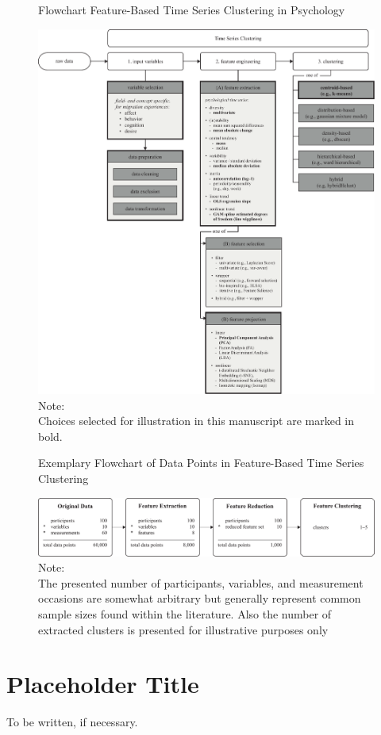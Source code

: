 \documentclass[man, 12pt, a4paper]{apa7}
\theoremstyle{break}
\theoremstyle{plain}
\begin{document}
\begin{figure}[hbtp]
  \caption{Flowchart Feature-Based Time Series Clustering in Psychology}
  \label{fig:TSCFlow}
  \centering\includegraphics[width=\textwidth]{figures/TS Cluster Flow/TimeSeriesClusterFlowSelection.pdf}
  \caption*{Note: \\
  Choices selected for illustration in this manuscript are marked in bold.}
\end{figure}

\begin{figure}[hbtp]
  \caption{Exemplary Flowchart of Data Points in Feature-Based Time Series Clustering}
  \label{fig:TSCFlowN}
  \centering\includegraphics[width=\textwidth]{figures/TS Cluster Flow/tsClustFlowN.pdf}
  \caption*{Note: \\
  The presented number of participants, variables, and measurement occasions are somewhat arbitrary but generally represent common sample sizes found within the literature. Also the number of extracted clusters is presented for illustrative purposes only}
\end{figure}

\printbibliography

\appendix

\section{Placeholder Title}
\label{app:AppendixTitle}
To be written, if necessary.
\end{document}
